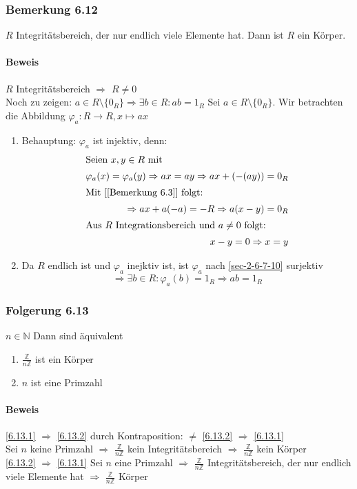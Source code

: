 \documentclass[a4paper]{scrartcl}
\theoremstyle{definition}
\theoremstyle{plain}
\theoremstyle{plain}
\theoremstyle{remark}
\theoremstyle{remark}
\theoremstyle{remark}
\begin{document}
\subsubsection{Bemerkung 6.12}
\label{sec-3-3-3}
$R$ Integritätsbereich, der nur endlich viele Elemente hat. Dann ist $R$ ein Körper.
\paragraph{Beweis}
\label{sec-3-3-3-1}
$R$ Integritätsbereich $\Rightarrow$ $R\neq 0$ \\
     Noch zu zeigen: $a\in R\setminus\{0_R\} \Rightarrow \exists b\in R: a b = 1_R$
Sei $a\in R\setminus\{0_R\}$. Wir betrachten die Abbildung $\varphi_a: R\to R,x\mapsto a x$
\begin{enumerate}
\item Behauptung: $\varphi_a$ ist injektiv, denn:
\begin{align}
\intertext{Seien $x,y\in R$ mit}
\varphi_a(x) =\varphi_a(y) \Rightarrow a x = a y \Rightarrow a x + (-(a y)) = 0_R \\
\intertext{Mit [[Bemerkung 6.3]] folgt:}
\Rightarrow a x + a(-a) = -R \Rightarrow a(x - y) = 0_R  \\
\intertext{Aus $R$ Integrationsbereich und $a\neq 0$ folgt:}
x - y = 0 \Rightarrow x = y
\end{align}
\item Da $R$ endlich ist und $\varphi_a$ inejktiv ist, ist $\varphi_a$ nach \ref{sec-2-6-7-10} surjektiv
\[\Rightarrow  \exists b\in R: \varphi_a(b) = 1_R \Rightarrow a b = 1_R\]
\end{enumerate}
\subsubsection{Folgerung 6.13}
\label{sec-3-3-4}
$n\in\mathbb{N}$ Dann sind äquivalent
\begin{enumerate}
\item \label{6.13.1} $\frac{\mathbb{Z}}{n\mathbb{Z}}$ ist ein Körper
\item \label{6.13.2} $n$ ist eine Primzahl
\end{enumerate}
\paragraph{Beweis}
\label{sec-3-3-4-1}
\ref{6.13.1} $\Rightarrow$ \ref{6.13.2} durch Kontraposition: $\neq$ \ref{6.13.2} $\Rightarrow$ \ref{6.13.1} \\
     Sei $n$ keine Primzahl $\Rightarrow$ $\frac{\mathbb{Z}}{n\mathbb{Z}}$ kein Integritätsbereich $\Rightarrow$ $\frac{\mathbb{Z}}{n\mathbb{Z}}$ kein Körper \\
     \ref{6.13.2} $\Rightarrow$ \ref{6.13.1} Sei $n$ eine Primzahl $\Rightarrow$ $\frac{\mathbb{Z}}{n\mathbb{Z}}$ Integritätsbereich, der nur endlich viele Elemente hat $\Rightarrow$ $\frac{\mathbb{Z}}{n\mathbb{Z}}$ Körper
\end{document}
